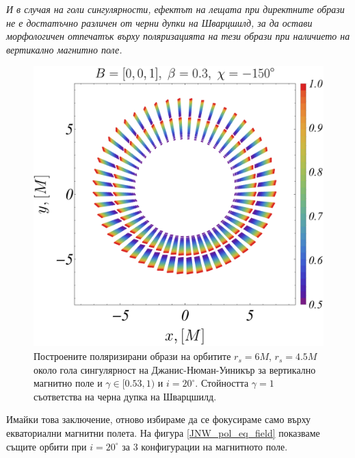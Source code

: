 \emph{И в случая на голи сингулярности, ефектът на лещата при директните образи не е достатъчно различен от черни дупки на Шварцшилд, за да остави морфологичен отпечатък върху поляризацията на тези образи при наличието на вертикално магнитно поле.}

\newpage

\begin{figure}[!htb]
	\centering
	\includegraphics[scale = 0.25]{JNW/pol_vert.pdf}
	\caption[Поляризирани образи около гола сингулярност на Джанис-Нюман-Уиникър за вертикално магнитно поле.]{\small Построените поляризирани образи на орбитите $r_s = 6M$, $r_s = 4.5M$ около гола сингулярност на Джанис-Нюман-Уиникър за вертикално магнитно поле и $\gamma \in[0.53,1)$ и $i = 20^\circ$. Стойността $\gamma = 1$ съответства на черна дупка на Шварцшилд.} 
	\label{JNW_pol_vert_field}
\end{figure}

Имайки това заключение, отново избираме да се фокусираме само върху екваториални магнитни полета. На фигура \ref{JNW_pol_eq_field} показваме същите орбити при $i = 20^\circ$ за 3 конфигурации на магнитното поле.\\


